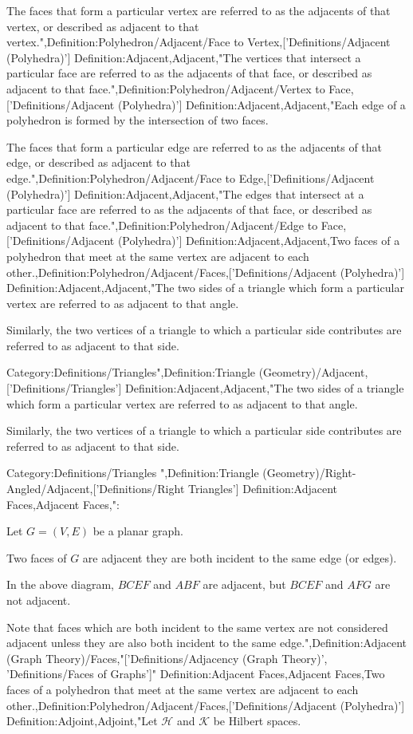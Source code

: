 The faces that form a particular vertex are referred to as the adjacents of that vertex, or described as adjacent to that vertex.",Definition:Polyhedron/Adjacent/Face to Vertex,['Definitions/Adjacent (Polyhedra)']
Definition:Adjacent,Adjacent,"The vertices that intersect a particular face are referred to as the adjacents of that face, or described as adjacent to that face.",Definition:Polyhedron/Adjacent/Vertex to Face,['Definitions/Adjacent (Polyhedra)']
Definition:Adjacent,Adjacent,"Each edge of a polyhedron is formed by the intersection of two faces.

The faces that form a particular edge are referred to as the adjacents of that edge, or described as adjacent to that edge.",Definition:Polyhedron/Adjacent/Face to Edge,['Definitions/Adjacent (Polyhedra)']
Definition:Adjacent,Adjacent,"The edges that intersect at a particular face are referred to as the adjacents of that face, or described as adjacent to that face.",Definition:Polyhedron/Adjacent/Edge to Face,['Definitions/Adjacent (Polyhedra)']
Definition:Adjacent,Adjacent,Two faces of a polyhedron that meet at the same vertex are adjacent to each other.,Definition:Polyhedron/Adjacent/Faces,['Definitions/Adjacent (Polyhedra)']
Definition:Adjacent,Adjacent,"The two sides of a triangle which form a particular vertex are referred to as adjacent to that angle.

Similarly, the two vertices of a triangle to which a particular side contributes are referred to as adjacent to that side.


Category:Definitions/Triangles",Definition:Triangle (Geometry)/Adjacent,['Definitions/Triangles']
Definition:Adjacent,Adjacent,"The two sides of a triangle which form a particular vertex are referred to as adjacent to that angle.

Similarly, the two vertices of a triangle to which a particular side contributes are referred to as adjacent to that side.


Category:Definitions/Triangles
",Definition:Triangle (Geometry)/Right-Angled/Adjacent,['Definitions/Right Triangles']
Definition:Adjacent Faces,Adjacent Faces,":

Let $G = \left( V, E \right)$ be a planar graph.

Two faces of $G$ are adjacent  they are both incident to the same edge (or edges).

In the above diagram, $BCEF$ and $ABF$ are adjacent, but $BCEF$ and $AFG$ are not adjacent.


Note that faces which are both incident to the same vertex are not considered adjacent unless they are also both incident to the same edge.",Definition:Adjacent (Graph Theory)/Faces,"['Definitions/Adjacency (Graph Theory)', 'Definitions/Faces of Graphs']"
Definition:Adjacent Faces,Adjacent Faces,Two faces of a polyhedron that meet at the same vertex are adjacent to each other.,Definition:Polyhedron/Adjacent/Faces,['Definitions/Adjacent (Polyhedra)']
Definition:Adjoint,Adjoint,"Let $\mathcal H$ and $\mathcal K$ be Hilbert spaces.

